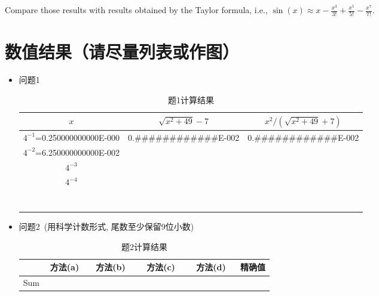 \documentclass[UTF8]{ctexart}
\begin{document}
\begin{itemize}
\vspace{-0.2in}
Compare those results with results obtained by the Taylor formula, i.e., $\sin(x) \approx x- \frac{x^3}{3!} +  \frac{x^5}{5!} - \frac{x^7}{7!}$.
\end{itemize}

\clearpage

\section{数值结果（请尽量列表或作图）}
\begin{itemize}
  \item 问题1
\begin{table}[htb]
\begin{center}
\begin{tabular}{|c|c|c|} %
\hline
$x$ & $\sqrt{x^2+49}-7$ & $ x^2/(\sqrt{x^2+49}+7)$ \\
\hline
$4^{-1}$=\color{blue}0.250000000000E-000 &\color{blue} 0.\#\#\#\#\#\#\#\#\#\#\#\#E-002 &\color{blue} 0.\#\#\#\#\#\#\#\#\#\#\#\#E-002 \\
\hline
$4^{-2}$=6.250000000000E-002  &  &  \\
\hline
$4^{-3}$ &  &  \\
\hline
$4^{-4}$  &  &  \\
\hline
 &  &  \\
\hline
 &  &  \\
\hline
 &  &  \\
\hline
 &  &  \\
\hline
 &  &  \\
\hline
 &  &  \\
\hline
 &  &  \\
\hline
\end{tabular}
\end{center}
\caption{题1计算结果}
\end{table}


 \item  问题2~(用科学计数形式, 尾数至少保留9位小数)

 \begin{table}[htb]
 \begin{center}
\begin{tabular}{|c|c|c|c|c|c|} %
\hline
 & 方法(a) & 方法(b) & 方法(c) & 方法(d) & 精确值 \quad  \\
\hline
Sum & $\quad\quad\quad\quad$ \quad & $\quad\quad\quad\quad\quad $  \quad & \quad$\quad\quad\quad\quad\quad$  & \quad$\quad\quad\quad\quad\quad$  & \\
\hline
\end{tabular}
\end{center}
\caption{题2计算结果}
\end{table}



\end{itemize}
\end{document}
